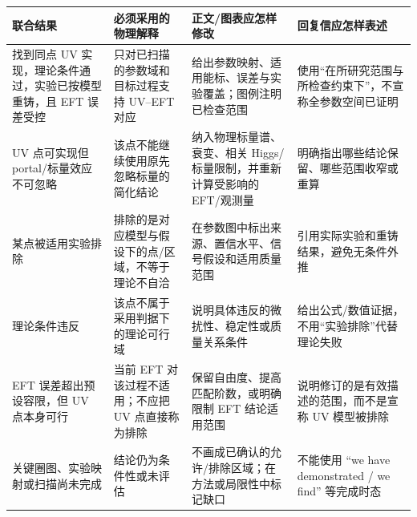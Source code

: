 \documentclass[
  chinese,
  UTF8]{ctexart}
\newcounter{none} %
\begin{document}
{\def\LTcaptype{none} %
\begin{longtable}[]{@{}
  >{\raggedright\arraybackslash}p{}
  >{\raggedright\arraybackslash}p{}
  >{\raggedright\arraybackslash}p{}
  >{\raggedright\arraybackslash}p{}@{}}
\toprule\noalign{}
\begin{minipage}[b]{\linewidth}\raggedright
联合结果
\end{minipage} & \begin{minipage}[b]{\linewidth}\raggedright
必须采用的物理解释
\end{minipage} & \begin{minipage}[b]{\linewidth}\raggedright
正文/图表应怎样修改
\end{minipage} & \begin{minipage}[b]{\linewidth}\raggedright
回复信应怎样表述
\end{minipage} \\
\midrule\noalign{}
\endhead
\bottomrule\noalign{}
\endlastfoot
找到同点 UV 实现，理论条件通过，实验已按模型重铸，且 EFT 误差受控 &
只对已扫描的参数域和目标过程支持 UV--EFT 对应 &
给出参数映射、适用能标、误差与实验覆盖；图例注明已检查范围 &
使用``在所研究范围与所检查约束下''，不宣称全参数空间已证明 \\
UV 点可实现但 portal/标量效应不可忽略 &
该点不能继续使用原先忽略标量的简化结论 & 纳入物理标量谱、衰变、相关
Higgs/标量限制，并重新计算受影响的 EFT/观测量 &
明确指出哪些结论保留、哪些范围收窄或重算 \\
某点被适用实验排除 & 排除的是对应模型与假设下的点/区域，不等于理论不自洽
& 在参数图中标出来源、置信水平、信号假设和适用质量范围 &
引用实际实验和重铸结果，避免无条件外推 \\
理论条件违反 & 该点不属于采用判据下的理论可行域 &
说明具体违反的微扰性、稳定性或质量关系条件 &
给出公式/数值证据，不用``实验排除''代替理论失败 \\
EFT 误差超出预设容限，但 UV 点本身可行 & 当前 EFT 对该过程不适用；不应把
UV 点直接称为排除 & 保留自由度、提高匹配阶数，或明确限制 EFT
结论适用范围 & 说明修订的是有效描述的范围，而不是宣称 UV 模型被排除 \\
关键圈图、实验映射或扫描尚未完成 & 结论仍为条件性或未评估 &
不画成已确认的允许/排除区域；在方法或局限性中标记缺口 & 不能使用 ``we
have demonstrated / we find'' 等完成时态 \\
\end{longtable}
}
\end{document}
